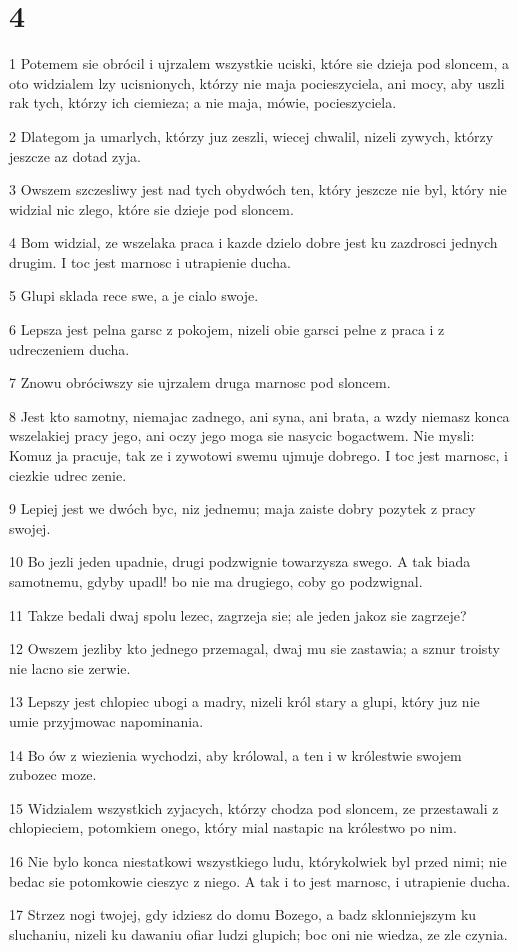 \chapter{4}

\par 1 Potemem sie obrócil i ujrzalem wszystkie uciski, które sie dzieja pod sloncem, a oto widzialem lzy ucisnionych, którzy nie maja pocieszyciela, ani mocy, aby uszli rak tych, którzy ich ciemieza; a nie maja, mówie, pocieszyciela.
\par 2 Dlategom ja umarlych, którzy juz zeszli, wiecej chwalil, nizeli zywych, którzy jeszcze az dotad zyja.
\par 3 Owszem szczesliwy jest nad tych obydwóch ten, który jeszcze nie byl, który nie widzial nic zlego, które sie dzieje pod sloncem.
\par 4 Bom widzial, ze wszelaka praca i kazde dzielo dobre jest ku zazdrosci jednych drugim. I toc jest marnosc i utrapienie ducha.
\par 5 Glupi sklada rece swe, a je cialo swoje.
\par 6 Lepsza jest pelna garsc z pokojem, nizeli obie garsci pelne z praca i z udreczeniem ducha.
\par 7 Znowu obróciwszy sie ujrzalem druga marnosc pod sloncem.
\par 8 Jest kto samotny, niemajac zadnego, ani syna, ani brata, a wzdy niemasz konca wszelakiej pracy jego, ani oczy jego moga sie nasycic bogactwem. Nie mysli: Komuz ja pracuje, tak ze i zywotowi swemu ujmuje dobrego. I toc jest marnosc, i ciezkie udrec zenie.
\par 9 Lepiej jest we dwóch byc, niz jednemu; maja zaiste dobry pozytek z pracy swojej.
\par 10 Bo jezli jeden upadnie, drugi podzwignie towarzysza swego. A tak biada samotnemu, gdyby upadl! bo nie ma drugiego, coby go podzwignal.
\par 11 Takze bedali dwaj spolu lezec, zagrzeja sie; ale jeden jakoz sie zagrzeje?
\par 12 Owszem jezliby kto jednego przemagal, dwaj mu sie zastawia; a sznur troisty nie lacno sie zerwie.
\par 13 Lepszy jest chlopiec ubogi a madry, nizeli król stary a glupi, który juz nie umie przyjmowac napominania.
\par 14 Bo ów z wiezienia wychodzi, aby królowal, a ten i w królestwie swojem zubozec moze.
\par 15 Widzialem wszystkich zyjacych, którzy chodza pod sloncem, ze przestawali z chlopieciem, potomkiem onego, który mial nastapic na królestwo po nim.
\par 16 Nie bylo konca niestatkowi wszystkiego ludu, którykolwiek byl przed nimi; nie bedac sie potomkowie cieszyc z niego. A tak i to jest marnosc, i utrapienie ducha.
\par 17 Strzez nogi twojej, gdy idziesz do domu Bozego, a badz sklonniejszym ku sluchaniu, nizeli ku dawaniu ofiar ludzi glupich; boc oni nie wiedza, ze zle czynia.

